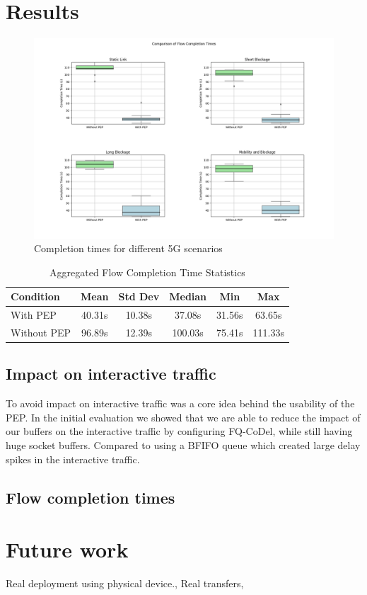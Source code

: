 \documentclass[a4paper,english, 11pt]{report}
\begin{document}
\section{Results}

\begin{figure}[h!] %
	\centering
	\includegraphics[scale=0.40]{../diagrams/witestlab/fcts.png}
  	\caption{Completion times for different 5G scenarios}
  	\label{fig:sb_ultra}
\end{figure}

\begin{table}[h!]
\centering
\begin{tabular}{lccccc}
\toprule
Condition & Mean & Std Dev & Median & Min & Max \\
\midrule
With PEP & 40.31s & 10.38s & 37.08s & 31.56s & 63.65s\\
Without PEP & 96.89s & 12.39s & 100.03s & 75.41s & 111.33s\\

\bottomrule
\end{tabular}
\caption{Aggregated Flow Completion Time Statistics}
\label{tab:aggregated_fct_statistics}
\end{table} 

\subsection{Impact on interactive traffic}
To avoid impact on interactive traffic was a core idea behind the usability of the PEP. In the initial evaluation we showed that we are able to reduce the impact of our buffers on the interactive traffic by configuring FQ-CoDel, while still having huge socket buffers. Compared to using a BFIFO queue which created large delay spikes in the interactive traffic.\\


\subsection{Flow completion times}

\section{Future work}
Real deployment using physical device.,
Real transfers,



{}

\end{document}
